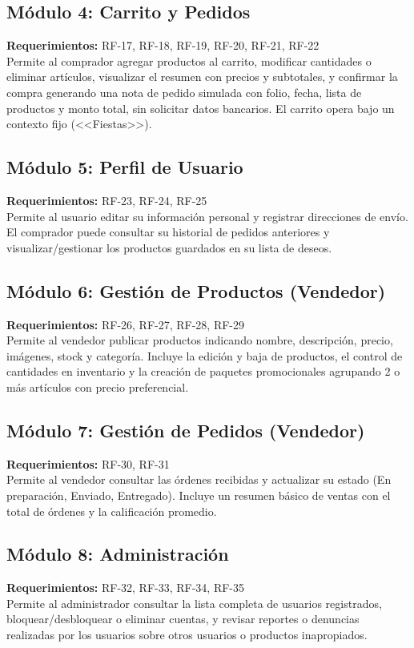 \documentclass[12pt,a4paper]{article}
\begin{document}
\subsection{Módulo 4: Carrito y Pedidos}
\textbf{Requerimientos:} RF-17, RF-18, RF-19, RF-20, RF-21, RF-22\\
Permite al comprador agregar productos al carrito, modificar cantidades o eliminar artículos, visualizar el resumen con precios y subtotales, y confirmar la compra generando una nota de pedido simulada con folio, fecha, lista de productos y monto total, sin solicitar datos bancarios. El carrito opera bajo un contexto fijo (<<Fiestas>>).

\subsection{Módulo 5: Perfil de Usuario}
\textbf{Requerimientos:} RF-23, RF-24, RF-25\\
Permite al usuario editar su información personal y registrar direcciones de envío. El comprador puede consultar su historial de pedidos anteriores y visualizar/gestionar los productos guardados en su lista de deseos.

\subsection{Módulo 6: Gestión de Productos (Vendedor)}
\textbf{Requerimientos:} RF-26, RF-27, RF-28, RF-29\\
Permite al vendedor publicar productos indicando nombre, descripción, precio, imágenes, stock y categoría. Incluye la edición y baja de productos, el control de cantidades en inventario y la creación de paquetes promocionales agrupando 2 o más artículos con precio preferencial.

\subsection{Módulo 7: Gestión de Pedidos (Vendedor)}
\textbf{Requerimientos:} RF-30, RF-31\\
Permite al vendedor consultar las órdenes recibidas y actualizar su estado (En preparación, Enviado, Entregado). Incluye un resumen básico de ventas con el total de órdenes y la calificación promedio.

\subsection{Módulo 8: Administración}
\textbf{Requerimientos:} RF-32, RF-33, RF-34, RF-35\\
Permite al administrador consultar la lista completa de usuarios registrados, bloquear/desbloquear o eliminar cuentas, y revisar reportes o denuncias realizadas por los usuarios sobre otros usuarios o productos inapropiados.
\end{document}

